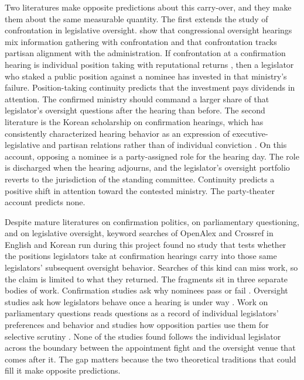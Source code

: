 \documentclass[11pt]{article}
\begin{document}
Two literatures make opposite predictions about this carry-over, and they make them about the same measurable quantity. The first extends the study of confrontation in legislative oversight. \citet{eldes2023} show that congressional oversight hearings mix information gathering with confrontation and that confrontation tracks partisan alignment with the administration. If confrontation at a confirmation hearing is individual position taking with reputational returns \citep{mayhew1974}, then a legislator who staked a public position against a nominee has invested in that ministry's failure. Position-taking continuity predicts that the investment pays dividends in attention. The confirmed ministry should command a larger share of that legislator's oversight questions after the hearing than before. The second literature is the Korean scholarship on confirmation hearings, which has consistently characterized hearing behavior as an expression of executive-legislative and partisan relations rather than of individual conviction \citep{choi2008, ko2018, yoon2020}. On this account, opposing a nominee is a party-assigned role for the hearing day. The role is discharged when the hearing adjourns, and the legislator's oversight portfolio reverts to the jurisdiction of the standing committee. Continuity predicts a positive shift in attention toward the contested ministry. The party-theater account predicts none.

Despite mature literatures on confirmation politics, on parliamentary questioning, and on legislative oversight, keyword searches of OpenAlex and Crossref in English and Korean run during this project found no study that tests whether the positions legislators take at confirmation hearings carry into those same legislators' subsequent oversight behavior. Searches of this kind can miss work, so the claim is limited to what they returned. The fragments sit in three separate bodies of work. Confirmation studies ask why nominees pass or fail \citep{yoon2020}. Oversight studies ask how legislators behave once a hearing is under way \citep{eldes2023}. Work on parliamentary questions reads questions as a record of individual legislators' preferences and behavior \citep{martin2011} and studies how opposition parties use them for selective scrutiny \citep{senninger2017}. None of the studies found follows the individual legislator across the boundary between the appointment fight and the oversight venue that comes after it. The gap matters because the two theoretical traditions that could fill it make opposite predictions.
\end{document}
